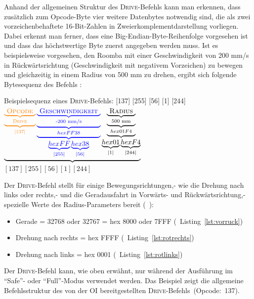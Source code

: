 Anhand der allgemeinen Struktur des \textsc{Drive}-Befehls kann man erkennen, dass zusätzlich zum Opcode-Byte vier weitere Datenbytes notwendig sind, die als zwei vorzeichenbehaftete 16-Bit-Zahlen in Zweierkomplementdarstellung vorliegen. Dabei erkennt man ferner, dass eine Big-Endian-Byte-Reihenfolge vorgesehen ist und dass das höchstwertige Byte zuerst angegeben werden muss. Ist es beispielsweise vorgesehen, den Roomba mit einer Geschwindigkeit von 200 mm/s in Rückwärtsrichtung (Geschwindigkeit mit negativem Vorzeichen) zu bewegen und gleichzeitig in einem Radius von 500 mm zu drehen, ergibt sich folgende Bytesequenz des Befehls \cite{IRobot2010}:
\begin{beispiel}{Beispielsequenz eines \textsc{Drive}-Befehls: [137] [255] [56] [1] [244]} \\
\centering
\(
\underbrace{\color{orange}\underbrace{\underbrace{\text{\textsc{ Opcode }}}_{\substack{\text{\textsc{Drive}}}}}_{\substack{\text{\textsc{|137|}}}}
\color{blue}\underbrace{\underbrace{\underbrace{\text{\textsc{ Geschwindigkeit }}}_{\color{blue}\substack{\text{-200 mm/s}}}}_{\color{blue}\substack{hex FF38}}}_{\color{blue}\substack{\underbrace{hex FF}_{\substack{|255|}}\underbrace{hex 38}_{\substack{|56|}}}}\color{black}\underbrace{\underbrace{\underbrace{\text{\textsc{ Radius }}}_{\substack{\text{500 mm}}}}_{\substack{hex 01F4}}}_{\substack{\underbrace{hex 01}_{\substack{|1|}}\underbrace{hex F4}_{\substack{|244|}}}}} \)\\
\( [137] [255] [56] [1] [244] \)
\label{exa:drive}
\end{beispiel}

Der \textsc{Drive}-Befehl stellt für einige Bewegungsrichtungen,- wie die Drehung nach links oder rechts,- und die Geradausfahrt in Vorwärts- und Rückwärtsrichtung,- spezielle Werte des Radius-Parameters bereit (\vgl~\cite{IRobot2010}):

\begin{itemize}
  \item Gerade = 32768 oder 32767 = hex 8000 oder 7FFF (\vgl~Listing~\ref{lst:vorruck})
  \item Drehung nach rechts = hex FFFF (\vgl~Listing~\ref{lst:rotrechts})
  \item Drehung nach links = hex 0001 (\vgl~Listing~\ref{lst:rotlinks})
\end{itemize}

Der \textsc{Drive}-Befehl kann, wie oben erwähnt, nur während der Ausführung im \enquote{Safe}- oder \enquote{Full}-Modus verwendet werden. Das \og Beispiel zeigt die allgemeine Befehlsstruktur des von der OI bereitgestellten \textsc{Drive}-Befehls~(Opcode:~137). 

